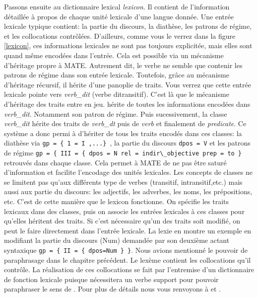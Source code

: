 Passons ensuite au dictionnaire lexical \emph{lexicon}. Il contient de l'information détaillée à propos de chaque unité lexicale d'une langue donnée. Une entrée lexicale typique contient: la partie du discours, la diathèse, les patrons de régime, et les collocations contrôlées. D'ailleurs, comme vous le verrez dans la figure \ref{lexicon}, ces informations lexicales ne sont pas toujours explicitée, mais elles sont quand même encodées dans l'entrée. Cela est possible via un mécanisme d'héritage propre à MATE. Autrement dit, le verbe  ne semble que contenir les patrons de régime dans son entrée lexicale. Toutefois, grâce au mécanisme d'héritage récursif, il hérite d'une panoplie de traits. Vous verrez que cette entrée lexicale pointe vers \emph{verb\_dit} (verbe ditransitif). C'est là que le mécanisme d'héritage des traits entre en jeu.  hérite de toutes les informations encodées dans \emph{verb\_dit}. Notamment son patron de régime. Puis sucessivement, la classe \emph{verb\_dit} hérite des traits de \emph{verb\_dt} puis de \emph{verb} et finalement de \emph{predicate}. Ce système a donc permi à  d'hériter de tous les traits encodés dans ces classes: la diathèse via \lstinline!gp = { 1 = I ,...} !, la partie du discours \lstinline{dpos = V} et les patrons de régime \lstinline!gp = { III = { dpos = N rel = indir\_objective prep = to }! retrouvés dans chaque classe. Cela permet à MATE de ne pas être saturé d'information et facilite l'encodage des unités lexicales. Les concepts de classes ne se limitent pas qu'aux différents type de verbes (transitif, intransitif,etc.) mais aussi aux partie du discours: les adjectifs, les adverbes, les noms, les prépositions, etc. C'est de cette manière que le lexicon fonctionne. On spécifie les traits lexicaux dans des classes, puis on associe les entrées lexicales à ces classes pour qu'elles héritent des traits. Si c'est nécessaire qu'un des traits soit modifié, on peut le faire directement dans l'entrée lexicale. La lexie  en montre un exemple en modifiant la partie du discours (Num) demandée par son deuxième actant syntaxique \lstinline!gp = { II = { dpos=Num } }!. Nous avions mentionné le pouvoir de paraphrasage dans le chapitre précédent. Le lexème  contient les collocations qu'il contrôle. La réalisation de ces collocations se fait par l'entremise d'un dictionnaire de fonction lexicale puisque  nécessitera un verbe support pour pouvoir paraphraser le sens de . Pour plus de détails nous vous renvoyons à \citep{lareau18} et \citep{LambreyImplementationcollocationspour2017}.

